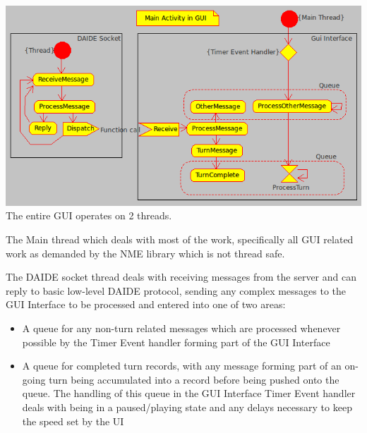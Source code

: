 \documentclass[pdftex,12pt,a4paper]{report}
\begin{document}
\includegraphics[scale=0.5]{./gui/Activity.png}\\[0.5cm]
The entire GUI operates on 2 threads.

The Main thread which deals with most of the work, specifically all GUI related work as demanded by the NME library which is not thread safe.

The DAIDE socket thread deals with receiving messages from the server and can reply to basic low-level DAIDE protocol, sending any complex messages to the GUI Interface to be processed and entered into one of two areas:
\begin{itemize}
\item{A queue for any non-turn related messages which are processed whenever possible by the Timer Event handler forming part of the GUI Interface}
\item{A queue for completed turn records, with any message forming part of an on-going turn being accumulated into a record before being pushed onto the queue. The handling of this queue in the GUI Interface Timer Event handler deals with being in a paused/playing state and any delays necessary to keep the speed set by the UI}
\end{itemize}
\end{document}
